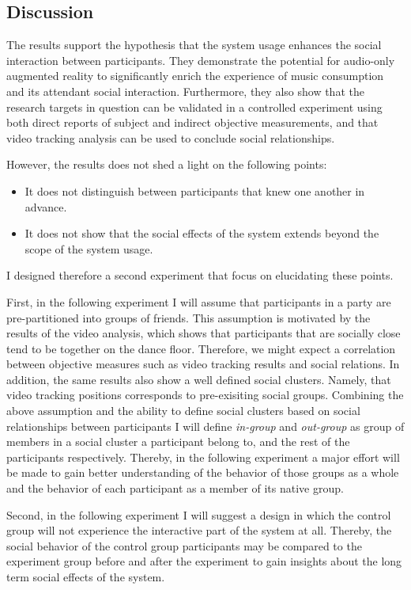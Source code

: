 \documentclass[a4paper,11pt]{article}
\newcommand{\definition}[1]{\emph{#1}}
\begin{document}
{\subsection{Discussion}

The results support the hypothesis that the system usage enhances the social interaction between participants.
They demonstrate the potential for audio-only augmented reality to significantly enrich the experience of music consumption and its attendant social interaction.
Furthermore, they also show that the research targets in question can be validated in a controlled experiment using both direct reports of subject and indirect objective measurements, and that video tracking analysis can be used to conclude social relationships.

However, the results does not shed a light on the following points:

\begin{itemize}
	\item It does not distinguish between participants that knew one another in advance.
	\item It does not show that the social effects of the system extends beyond the scope of the system usage.
\end{itemize}

I designed therefore a second experiment that focus on elucidating these points.

First, in the following experiment I will assume that participants in a party are pre-partitioned into groups of friends.
This assumption is motivated by the results of the video analysis, which shows that participants that are socially close tend to be together on the dance floor.
Therefore, we might expect a correlation between objective measures such as video tracking results and social relations.
In addition, the same results also show a well defined social clusters.
Namely, that video tracking positions corresponds to pre-exisiting social groups.
Combining the above assumption and the ability to define social clusters based on social relationships between participants I will define \definition{in-group} and \definition{out-group} as group of members in a social cluster a participant belong to, and the rest of the participants respectively.
Thereby, in the following experiment a major effort will be made to gain better understanding of the behavior of those groups as a whole and the behavior of each participant as a member of its native group.

Second, in the following experiment I will suggest a design in which the control group will not experience the interactive part of the system at all.
Thereby, the social behavior of the control group participants may be compared to the experiment group before and after the experiment to gain insights about the long term social effects of the system.

}
\end{document}
